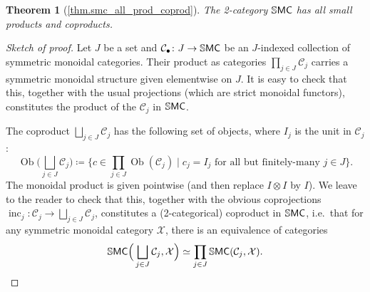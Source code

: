 \documentclass[11pt, oneside, article]{memoir}
\theoremstyle{plain}
\newtheorem*{theorem*}{Theorem}
\theoremstyle{definition}
\theoremstyle{remark}
\newcommand{\Set}[1]{\mathrm{#1}}%
\newcommand{\cat}[1]{\mathcal{#1}}%
\newcommand{\Cat}[1]{{\mathsf{#1}}}%
\newcommand{\CCat}[1]{\mathbb{\StrLeft{#1}{1}}\Cat{\StrGobbleLeft{#1}{1}}}%
\DeclareMathOperator{\ob}{\Set{Ob}}
\DeclareMathOperator{\inc}{inc}
\newcommand{\ssmc}{\CCat{SMC}}
\begin{document}
\begin{theorem*}[\ref{thm.smc_all_prod_coprod}]\label{page.smc_all_prod_coprod}
The 2-category $\ssmc$ has all small products and coproducts.
\end{theorem*}
\begin{proof}[Sketch of proof]
Let $J$ be a set and $\cat{C}_\bullet\colon J\to\ssmc$ be an $J$-indexed collection of symmetric monoidal categories. Their product as categories $\prod_{j\in J}\cat{C}_j$ carries a symmetric monoidal structure given elementwise on $J$. It is easy to check that this, together with the usual projections (which are strict monoidal functors), constitutes the product of the $\cat{C}_j$ in $\ssmc$.

The coproduct $\bigsqcup_{j\in J}\cat{C}_j$ has the following set of objects, where $I_j$ is the unit in $\cat{C}_j$:
\[
\ob\bigg(\bigsqcup_{j\in J}\cat{C}_j\bigg)\coloneqq
\bigg\{
c\in\prod_{j\in J}\ob(\cat{C}_j)
\;\bigg|\;
c_j=I_j\text{ for all but finitely-many }j\in J
\bigg\}.
\]
The monoidal product is given pointwise (and then replace $I\otimes I$ by $I$). We leave to the reader to check that this, together with the obvious coprojections $\inc_j\colon\cat{C}_j\to\bigsqcup_{j\in J}\cat{C}_j$, constitutes a (2-categorical) coproduct in $\ssmc$, i.e.\ that for any symmetric monoidal category $\cat{X}$, there is an equivalence of categories
\[
  \ssmc\Big(\bigsqcup_{j\in J}\cat{C}_j,\cat{X}\Big)\simeq\prod_{j\in J}\ssmc(\cat{C}_j,\cat{X}).
\qedhere
\]
\end{proof}




\printbibliography
\end{document}
